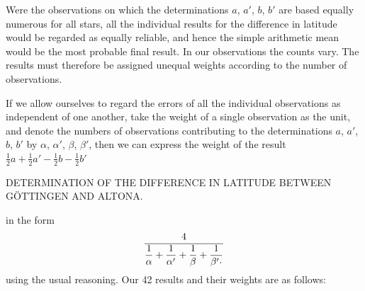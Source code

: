 Were the observations on which the determinations $a$, $a'$, $b$, $b'$ are based
equally numerous for all stars, all the individual results
for the difference in latitude would be regarded as equally reliable, and hence the
simple arithmetic mean would be the most probable final result. In our
observations the counts vary. The results must therefore be assigned
unequal weights according to the number of
observations.

If we allow ourselves to regard the errors of all the individual observations as
independent of one another, take the weight of a single observation
as the unit, and denote the numbers of observations contributing to
the determinations $a$, $a'$, $b$, $b'$ by $\alpha$, $\alpha'$, $\beta$, $\beta'$, then
we can express the weight of the result $\frac12a+\frac12a'-\frac12b-\frac12b'$

\clearpage
\noindent{}\parbox[t]{\dimexpr\textwidth-10mm\relax}{\centering\scriptsize DETERMINATION OF THE DIFFERENCE IN LATITUDE BETWEEN GÖTTINGEN AND ALTONA.}\par

\noindent in the form
\[
\frac{4}{\dfrac1\alpha+\dfrac1{\alpha'}+\dfrac1\beta+\dfrac1{\beta'\mathord{\text{\raisebox{.3ex}{.}}}}}
\]
using the usual reasoning. Our 42 results and their weights are
as follows:

